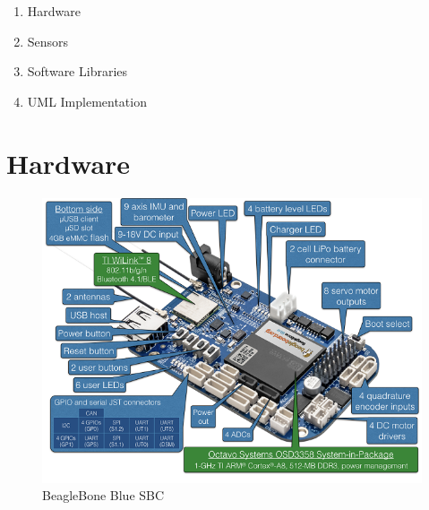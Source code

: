\documentclass[12pt,a4paper,twoside]{report}
\begin{document}
			\begin{enumerate}
				\item
					Hardware
				\item
					Sensors
				\item
					Software Libraries
				\item 
					UML Implementation
			\end{enumerate}  
			
		\section{Hardware}
			
			\begin{figure}[h!]
				\centering
				\includegraphics[width=1\linewidth]{beagle-bone-blue-annotated.png}
				\caption{BeagleBone Blue SBC}
				\label{fig:beaglebonebluesbc}
			\end{figure}
		
\end{document}
